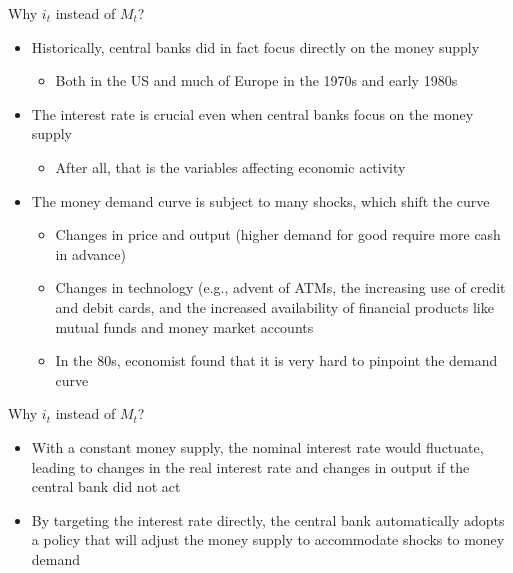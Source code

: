 \documentclass[aspectratio=1610]{beamer}
\begin{document}
\begin{frame}[wide]{Why $i_t$ instead of $M_t$?}
	\begin{itemize}
		\item Historically, central banks did in fact focus directly on the money supply
		\vspace{2mm}
		\begin{itemize}
			\item Both in the US and much of Europe in the 1970s and early 1980s
		\end{itemize}
		\vspace{2mm}
		\item The interest rate is crucial even when central banks focus on the money supply
		\vspace{2mm}
		\begin{itemize}
			\item After all, that is the variables affecting economic activity
		\end{itemize}
		\vspace{2mm}
		\item The money demand curve is subject to many shocks, which shift the curve
		\vspace{2mm}
		\begin{itemize}
			\item Changes in price and output (higher demand for good require more cash in advance)
			\item Changes in technology (e.g., advent of ATMs, the increasing use of credit and debit cards, and the increased availability of financial products like mutual funds and money market accounts
			\item In the 80s, economist found that it is very hard to pinpoint the demand curve
		\end{itemize}
	\end{itemize}
\end{frame}

\begin{frame}[wide]{Why $i_t$ instead of $M_t$?}
	\begin{itemize}
		\item With a constant money supply, the nominal interest rate would fluctuate, leading to changes in the real interest rate and changes in output if the central bank did not act
		\vspace{2mm}
		\item By targeting the interest rate directly, the central bank automatically adopts a policy that will adjust the money supply to accommodate shocks to money demand
		\vspace{2mm}	
	\end{itemize}
\end{frame}
\end{document}
